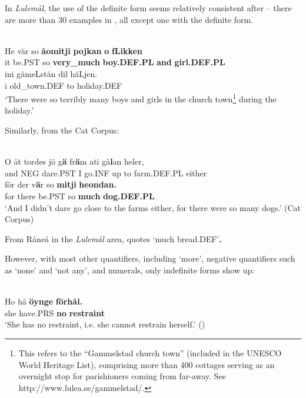 \z

In \textit{Lulemål}, the use of the definite form seems relatively consistent after  – there are more than 30 examples in \citet{Nyström1993}, all except one with the definite form. 

\ea \label{} 
\\
\gll He  vär  so  \textbf{åomitji} \textbf{pojkan} \textbf{o} \textbf{fLikken}\\
it  be.PST  so  \textbf{very\_much} \textbf{boy.DEF.PL} \textbf{and} \textbf{girl.DEF.PL}\\
\gll ini  gämeLstän  dil  häLjen.\\
i  old\_town.DEF  to  holiday.DEF\\
\glt ‘There were so terribly many boys and girls in the church town\footnote{ This refers to the “Gammelstad church town” (included in the UNESCO World Heritage List), comprising more than 400 cottages serving as an overnight stop for parishioners coming from far-away. See http://www.lulea.se/gammelstad/.} during the holiday.’

\z

Similarly, from the Cat Corpus:

\ea \label{} 
\\
\gll O  åt  tordes  jö  g\textbf{ä}  fr\textbf{ä}m  ati  gå\textbf{l}an  heler,\\
and  NEG  dare.PST  I  go.INF  up  to  farm.DEF.PL  either\\
\gll för  der  v\textbf{ä}r  so  \textbf{mitji} \textbf{  heondan.}\\
for  there  be.PST  so  \textbf{much} \textbf{dog.DEF.PL}\\
\glt ‘And I didn’t dare go close to the farms either, for there were so many dogs.’ (Cat Corpus)

\z

From Råneå in the \textit{Lulemål} area, \citet[17]{Delsing2003a} quotes\textbf{ } ‘much bread.DEF’\textbf{. }

However, with most other quantifiers, including  ‘more’, negative quantifiers such as  ‘none’ and  ‘not any’, and numerals, only indefinite forms show up:

\ea\label{}
\\
\gll Ho  hä  \textbf{öynge} \textbf{förhål.}\\
she  have.PRS  \textbf{no} \textbf{restraint}\\
\glt ‘She has no restraint, i.e. she cannot restrain herself.’ (\citet{Nyström1993})

